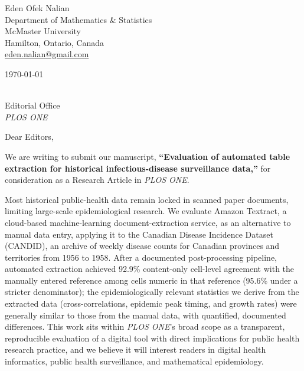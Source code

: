 \documentclass[11pt]{article}
\begin{document}
\noindent
Eden Ofek Nalian \\
Department of Mathematics \& Statistics \\
McMaster University \\
Hamilton, Ontario, Canada \\
\href{mailto:eden.nalian@gmail.com}{eden.nalian@gmail.com}

\smallskip
\noindent \today

\smallskip

 \\
Editorial Office \\
\textit{PLOS ONE}

\smallskip

\noindent Dear Editors,

\smallskip

We are writing to submit our manuscript, \textbf{``Evaluation of automated
table extraction for historical infectious-disease surveillance data,''} for consideration as a
Research Article in \textit{PLOS ONE}.

Most historical public-health data remain locked in scanned paper documents, limiting large-scale epidemiological research. We evaluate Amazon Textract, a cloud-based machine-learning document-extraction service, as an alternative to manual data entry, applying it to the Canadian Disease Incidence Dataset (CANDID), an archive of weekly disease counts for Canadian provinces and territories from 1956 to 1958. After a documented post-processing pipeline, automated extraction achieved 92.9\% content-only cell-level agreement with the manually entered reference among cells numeric in that reference (95.6\% under a stricter denominator); the epidemiologically relevant statistics we derive from the extracted data (cross-correlations, epidemic peak timing, and growth rates) were generally similar to those from the manual data, with quantified, documented differences. This work sits within \textit{PLOS ONE}'s broad scope as a transparent, reproducible evaluation of a digital tool with direct implications for public health research practice, and we believe it will interest readers in digital health informatics, public health surveillance, and mathematical epidemiology.
\end{document}
